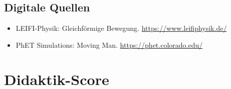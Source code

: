 \documentclass[11pt,a4paper]{article}
\begin{document}
\subsection{Digitale Quellen}
\begin{itemize}
    \item LEIFI-Physik: Gleichförmige Bewegung. \url{https://www.leifiphysik.de/}
    \item PhET Simulations: Moving Man. \url{https://phet.colorado.edu/}
\end{itemize}

\newpage
\section{Didaktik-Score}
\end{document}
